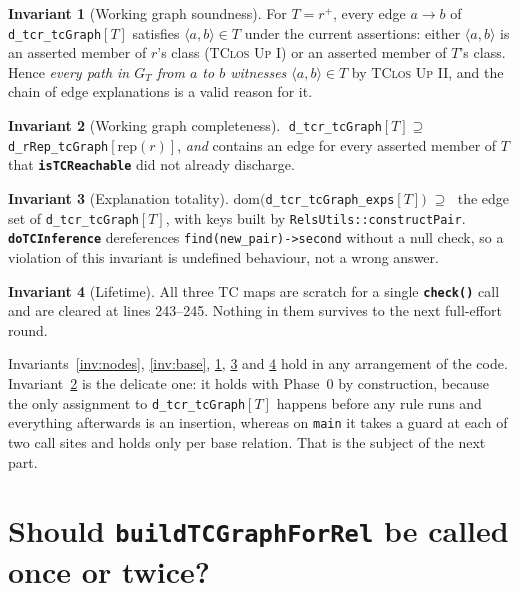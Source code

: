 \documentclass[11pt,a4paper]{article}
\newcommand{\code}[1]{\texttt{\small #1}}
\newcommand{\fn}[1]{\texttt{\small\bfseries #1}}
\newcommand{\tup}[1]{\langle #1 \rangle}
\newcommand{\tc}[1]{{#1}^{+}}
\newcommand{\rep}[1]{\mathrm{rep}(#1)}
\theoremstyle{definition}
\newtheorem{invariant}{Invariant}
\begin{document}
\begin{invariant}[Working graph soundness]\label{inv:sound}
For $T = \tc{r}$, every edge $a\to b$ of \code{d\_tcr\_tcGraph}$[T]$ satisfies
$\tup{a,b}\in T$ under the current assertions: either $\tup{a,b}$ is an asserted
member of $r$'s class (\textsc{TClos Up I}) or an asserted member of $T$'s
class. Hence \emph{every path in $G_T$ from $a$ to $b$ witnesses
$\tup{a,b}\in T$} by \textsc{TClos Up II}, and the chain of edge explanations is
a valid reason for it.
\end{invariant}

\begin{invariant}[Working graph completeness]\label{inv:complete}
$\;$\code{d\_tcr\_tcGraph}$[T] \supseteq$ \code{d\_rRep\_tcGraph}$[\rep{r}]$,
\emph{and} contains an edge for every asserted member of $T$ that
\fn{isTCReachable} did not already discharge.
\end{invariant}

\begin{invariant}[Explanation totality]\label{inv:tot}
$\mathrm{dom}($\code{d\_tcr\_tcGraph\_exps}$[T])\;\supseteq\;$ the edge set of
\code{d\_tcr\_tcGraph}$[T]$, with keys built by
\code{RelsUtils::constructPair}. \fn{doTCInference} dereferences
\code{find(new\_pair)->second} without a null check, so a violation of this
invariant is undefined behaviour, not a wrong answer.
\end{invariant}

\begin{invariant}[Lifetime]\label{inv:life}
All three TC maps are scratch for a single \fn{check()} call and are cleared at
lines 243--245. Nothing in them survives to the next full-effort round.
\end{invariant}

\noindent
Invariants~\ref{inv:nodes}, \ref{inv:base}, \ref{inv:sound}, \ref{inv:tot} and
\ref{inv:life} hold in any arrangement of the code. Invariant~\ref{inv:complete}
is the delicate one: it holds with Phase~0 by construction, because the only
assignment to \code{d\_tcr\_tcGraph}$[T]$ happens before any rule runs and
everything afterwards is an insertion, whereas on \code{main} it takes a
guard at each of two call sites and holds only per base relation. That is the
subject of the next part.

\part{Should \fn{buildTCGraphForRel} be called once or twice?}\label{part:tc}
\end{document}
